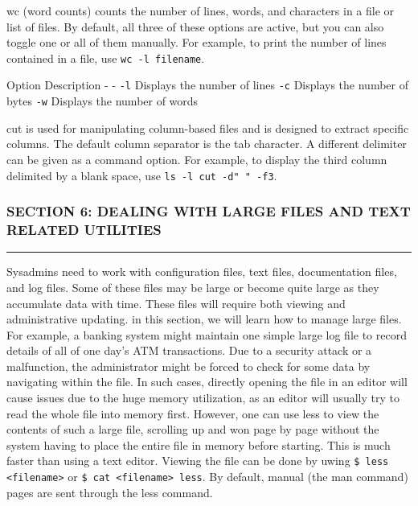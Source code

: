 wc (word counts) counts the number of lines, words, and characters in a
file or list of files. By default, all three of these options are
active, but you can also toggle one or all of them manually. For
example, to print the number of lines contained in a file, use
\texttt{wc -l filename}.

Option \textbar{} Description - \textbar{} - \texttt{-l} \textbar{}
Displays the number of lines \texttt{-c} \textbar{} Displays the number
of bytes \texttt{-w} \textbar{} Displays the number of words

cut is used for manipulating column-based files and is designed to
extract specific columns. The default column separator is the tab
character. A different delimiter can be given as a command option. For
example, to display the third column delimited by a blank space, use
\texttt{ls -l \textbar{} cut -d" " -f3}.

\subsubsection{SECTION 6: DEALING WITH LARGE FILES AND TEXT RELATED
UTILITIES}\label{section-6-dealing-with-large-files-and-text-related-utilities}

\begin{center}\rule{3in}{0.4pt}\end{center}

Sysadmins need to work with configuration files, text files,
documentation files, and log files. Some of these files may be large or
become quite large as they accumulate data with time. These files will
require both viewing and administrative updating. in this section, we
will learn how to manage large files. For example, a banking system
might maintain one simple large log file to record details of all of one
day's ATM transactions. Due to a security attack or a malfunction, the
administrator might be forced to check for some data by navigating
within the file. In such cases, directly opening the file in an editor
will cause issues due to the huge memory utilization, as an editor will
usually try to read the whole file into memory first. However, one can
use less to view the contents of such a large file, scrolling up and won
page by page without the system having to place the entire file in
memory before starting. This is much faster than using a text editor.
Viewing the file can be done by uwing
\texttt{\$ less \textless{}filename\textgreater{}} or
\texttt{\$ cat \textless{}filename\textgreater{} \textbar{} less}. By
default, manual (the man command) pages are sent through the less
command.

